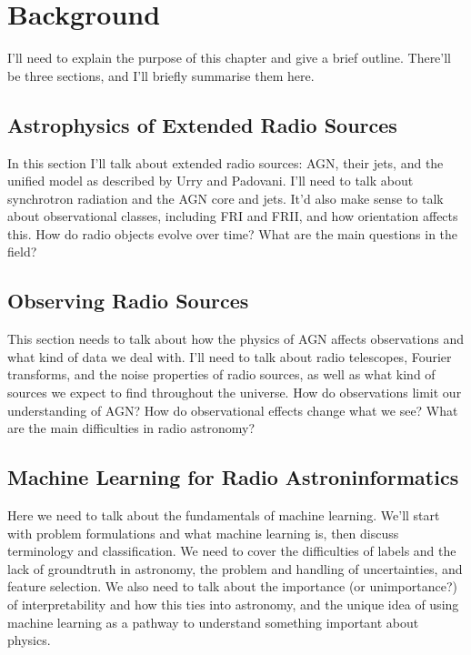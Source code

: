 \chapter{Background}
\label{cha:background}

I'll need to explain the purpose of this chapter and give a brief outline. There'll be three sections, and I'll briefly summarise them here.

\section{Astrophysics of Extended Radio Sources}
\label{sec:physics-of-radio-sources}

In this section I'll talk about extended radio sources: AGN, their jets, and the unified model as described by Urry and Padovani. I'll need to talk about synchrotron radiation and the AGN core and jets. It'd also make sense to talk about observational classes, including FRI and FRII, and how orientation affects this. How do radio objects evolve over time? What are the main questions in the field?


\section{Observing Radio Sources}
\label{sec:radio-astronomy}

This section needs to talk about how the physics of AGN affects observations and what kind of data we deal with. I'll need to talk about radio telescopes, Fourier transforms, and the noise properties of radio sources, as well as what kind of sources we expect to find throughout the universe. How do observations limit our understanding of AGN? How do observational effects change what we see? What are the main difficulties in radio astronomy?


\section{Machine Learning for Radio Astroninformatics}
\label{sec:radio-astroinformatics}

Here we need to talk about the fundamentals of machine learning. We'll start with problem formulations and what machine learning is, then discuss terminology and classification. We need to cover the difficulties of labels and the lack of groundtruth in astronomy, the problem and handling of uncertainties, and feature selection. We also need to talk about the importance (or unimportance?) of interpretability and how this ties into astronomy, and the unique idea of using machine learning as a pathway to understand something important about physics.
